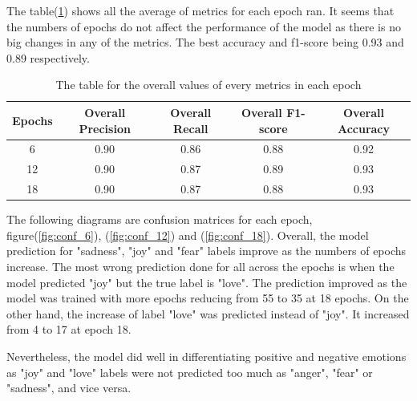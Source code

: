 The table(\ref{tab:overall_metrics}) shows all the average of metrics for each epoch ran. It seems that the numbers of epochs do not affect the performance of the model as there is no big changes in any of the metrics. The best accuracy and f1-score being 0.93 and 0.89 respectively.

\begin{table}[h!]
    \centering
    \begin{tabular}{|c|c|c|c|c|}\hline
          Epochs  & Overall Precision & Overall Recall & Overall F1-score & Overall Accuracy\\\hline
           6 & 0.90 & 0.86 & 0.88 & 0.92\\\hline
           12 & 0.90 & 0.87 & 0.89 & 0.93\\\hline
           18 & 0.90 & 0.87 & 0.88 & 0.93\\\hline
    \end{tabular}
    \caption{The table for the overall values of every metrics in each epoch}
    \label{tab:overall_metrics}
\end{table}

The following diagrams are confusion matrices for each epoch, figure(\ref{fig:conf_6}), (\ref{fig:conf_12}) and (\ref{fig:conf_18}). Overall, the model prediction for "sadness", "joy" and "fear" labels improve as the numbers of epochs increase. The most wrong prediction done for all across the epochs is when the model predicted "joy" but the true label is "love". The prediction improved as the model was trained with more epochs reducing from 55 to 35 at 18 epochs. On the other hand, the increase of label "love" was predicted instead of "joy". It increased from 4 to 17 at epoch 18. 

Nevertheless, the model did well in differentiating positive and negative emotions as "joy" and "love" labels were not predicted too much as "anger", "fear" or "sadness", and vice versa.

